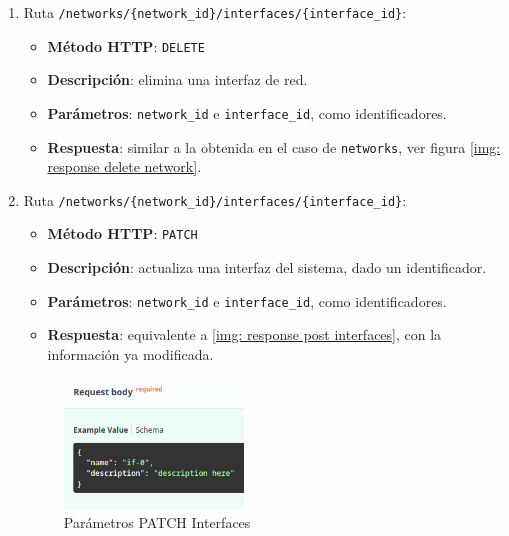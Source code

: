 \documentclass[a4paper, oneside, 12pt]{book}
\begin{document}
\begin{enumerate}
		\item Ruta \texttt{/networks/\{network\_id\}/interfaces/\{interface\_id\}}:
		
		\begin{itemize}
			\item \textbf{Método HTTP}: \texttt{DELETE}
			\item \textbf{Descripción}: elimina una interfaz de red.
			\item \textbf{Parámetros}: \texttt{network\_id} e \texttt{interface\_id}, como identificadores.
			\item \textbf{Respuesta}: similar a la obtenida en el caso de \texttt{networks}, ver figura \ref{img: response delete network}.
		\end{itemize}
	
		\item Ruta \texttt{/networks/\{network\_id\}/interfaces/\{interface\_id\}}:
		
		\begin{itemize}
			\item \textbf{Método HTTP}: \texttt{PATCH}
			\item \textbf{Descripción}: actualiza una interfaz del sistema, dado un identificador.
			\item \textbf{Parámetros}: \texttt{network\_id} e \texttt{interface\_id}, como identificadores.
			\item \textbf{Respuesta}: equivalente a \ref{img: response post interfaces}, con la información ya modificada.
		\end{itemize}
		
		\begin{figure}[h!]
			\begin{center}
				\includegraphics[width=0.45\textwidth]{img/parameters_patch_interfaces.png}
				\caption{Parámetros PATCH Interfaces}
				\label{img: parameters patch interfaces}
			\end{center}
		\end{figure}
	\end{enumerate}
	
	\pagebreak
	
\end{document}
